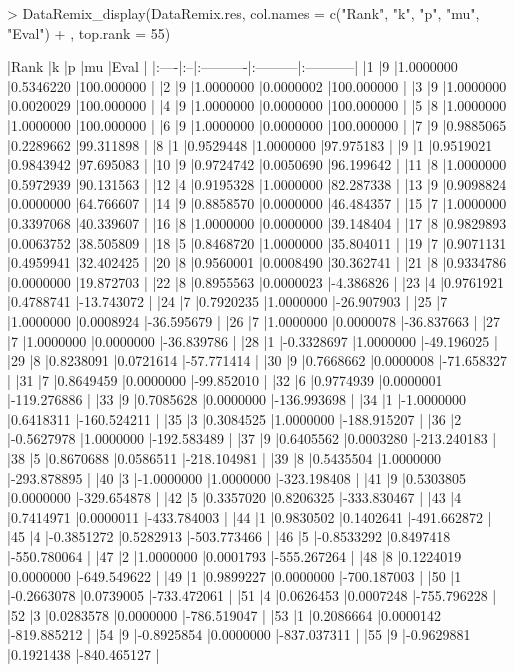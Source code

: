 \documentclass{article}
\begin{document}
\begin{Schunk}
\begin{Sinput}
> DataRemix_display(DataRemix.res, col.names = c("Rank", "k", "p", "mu", "Eval")
+                   , top.rank = 55)
\end{Sinput}
\begin{Soutput}
|Rank |k  |p          |mu        |Eval        |
|:----|:--|:----------|:---------|:-----------|
|1    |9  |1.0000000  |0.5346220 |100.000000  |
|2    |9  |1.0000000  |0.0000002 |100.000000  |
|3    |9  |1.0000000  |0.0020029 |100.000000  |
|4    |9  |1.0000000  |0.0000000 |100.000000  |
|5    |8  |1.0000000  |1.0000000 |100.000000  |
|6    |9  |1.0000000  |0.0000000 |100.000000  |
|7    |9  |0.9885065  |0.2289662 |99.311898   |
|8    |1  |0.9529448  |1.0000000 |97.975183   |
|9    |1  |0.9519021  |0.9843942 |97.695083   |
|10   |9  |0.9724742  |0.0050690 |96.199642   |
|11   |8  |1.0000000  |0.5972939 |90.131563   |
|12   |4  |0.9195328  |1.0000000 |82.287338   |
|13   |9  |0.9098824  |0.0000000 |64.766607   |
|14   |9  |0.8858570  |0.0000000 |46.484357   |
|15   |7  |1.0000000  |0.3397068 |40.339607   |
|16   |8  |1.0000000  |0.0000000 |39.148404   |
|17   |8  |0.9829893  |0.0063752 |38.505809   |
|18   |5  |0.8468720  |1.0000000 |35.804011   |
|19   |7  |0.9071131  |0.4959941 |32.402425   |
|20   |8  |0.9560001  |0.0008490 |30.362741   |
|21   |8  |0.9334786  |0.0000000 |19.872703   |
|22   |8  |0.8955563  |0.0000023 |-4.386826   |
|23   |4  |0.9761921  |0.4788741 |-13.743072  |
|24   |7  |0.7920235  |1.0000000 |-26.907903  |
|25   |7  |1.0000000  |0.0008924 |-36.595679  |
|26   |7  |1.0000000  |0.0000078 |-36.837663  |
|27   |7  |1.0000000  |0.0000000 |-36.839786  |
|28   |1  |-0.3328697 |1.0000000 |-49.196025  |
|29   |8  |0.8238091  |0.0721614 |-57.771414  |
|30   |9  |0.7668662  |0.0000008 |-71.658327  |
|31   |7  |0.8649459  |0.0000000 |-99.852010  |
|32   |6  |0.9774939  |0.0000001 |-119.276886 |
|33   |9  |0.7085628  |0.0000000 |-136.993698 |
|34   |1  |-1.0000000 |0.6418311 |-160.524211 |
|35   |3  |0.3084525  |1.0000000 |-188.915207 |
|36   |2  |-0.5627978 |1.0000000 |-192.583489 |
|37   |9  |0.6405562  |0.0003280 |-213.240183 |
|38   |5  |0.8670688  |0.0586511 |-218.104981 |
|39   |8  |0.5435504  |1.0000000 |-293.878895 |
|40   |3  |-1.0000000 |1.0000000 |-323.198408 |
|41   |9  |0.5303805  |0.0000000 |-329.654878 |
|42   |5  |0.3357020  |0.8206325 |-333.830467 |
|43   |4  |0.7414971  |0.0000011 |-433.784003 |
|44   |1  |0.9830502  |0.1402641 |-491.662872 |
|45   |4  |-0.3851272 |0.5282913 |-503.773466 |
|46   |5  |-0.8533292 |0.8497418 |-550.780064 |
|47   |2  |1.0000000  |0.0001793 |-555.267264 |
|48   |8  |0.1224019  |0.0000000 |-649.549622 |
|49   |1  |0.9899227  |0.0000000 |-700.187003 |
|50   |1  |-0.2663078 |0.0739005 |-733.472061 |
|51   |4  |0.0626453  |0.0007248 |-755.796228 |
|52   |3  |0.0283578  |0.0000000 |-786.519047 |
|53   |1  |0.2086664  |0.0000142 |-819.885212 |
|54   |9  |-0.8925854 |0.0000000 |-837.037311 |
|55   |9  |-0.9629881 |0.1921438 |-840.465127 |
\end{Soutput}
\end{Schunk}
\end{document}
